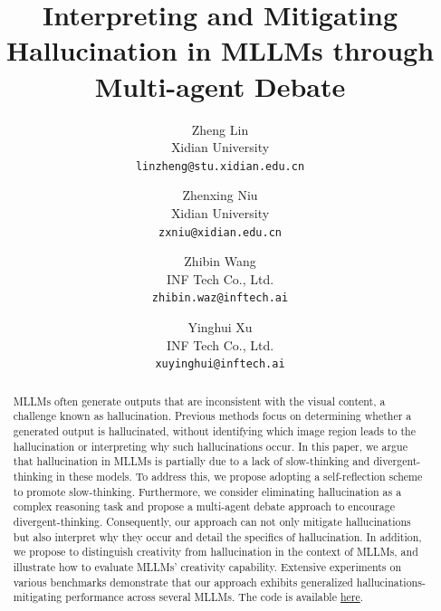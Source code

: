 \documentclass[10pt,twocolumn,letterpaper]{article}
\begin{document}
\title{Interpreting and Mitigating Hallucination in MLLMs through Multi-agent Debate}

\author{Zheng Lin\\
Xidian University\\
{\tt\small linzheng@stu.xidian.edu.cn}
\and
Zhenxing Niu\\
Xidian University\\
{\tt\small zxniu@xidian.edu.cn}
\and
Zhibin Wang\\
INF Tech Co., Ltd.\\
{\tt\small zhibin.waz@inftech.ai}
\and
Yinghui Xu\\
INF Tech Co., Ltd.\\
{\tt\small xuyinghui@inftech.ai}
}
 
\maketitle


\begin{abstract}
MLLMs often generate outputs that are inconsistent with the visual content, a challenge known as hallucination. Previous methods focus on determining whether a generated output is hallucinated, without identifying which image region leads to the hallucination or interpreting why such hallucinations occur. In this paper, we argue that hallucination in MLLMs is partially due to a lack of slow-thinking and 
divergent-thinking in these models. To address this, we propose adopting a self-reflection scheme to promote slow-thinking. Furthermore, we consider eliminating hallucination as a complex reasoning task and propose a multi-agent debate approach to encourage divergent-thinking. Consequently, our approach can not only mitigate hallucinations but also interpret why they occur and detail the specifics of hallucination. In addition, we propose to distinguish creativity from hallucination in the context of MLLMs, and illustrate how to evaluate MLLMs' creativity capability. Extensive experiments on various benchmarks demonstrate that our approach exhibits generalized hallucinations-mitigating performance across several MLLMs. The code is available \href{https://github.com/LZzz2000/MAD}{here}.
\end{abstract}
\end{document}
